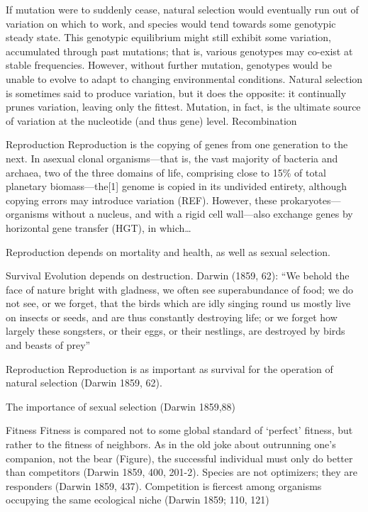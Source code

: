 \documentclass{tufte-book} %
\begin{document}
If mutation were to suddenly cease, natural selection would eventually run out of variation on which to work, and species would tend towards some genotypic steady state. This genotypic equilibrium might still exhibit some variation, accumulated through past mutations; that is, various genotypes may co-exist at stable frequencies. However, without further mutation, genotypes would be unable to evolve to adapt to changing environmental conditions. Natural selection is sometimes said to produce variation, but it does the opposite: it continually prunes variation, leaving only the fittest. Mutation, in fact, is the ultimate source of variation at the nucleotide (and thus gene) level.
Recombination

Reproduction
Reproduction is the copying of genes from one generation to the next. In asexual clonal organisms—that is, the vast majority of bacteria and archaea, two of the three domains of life, comprising close to 15\% of total planetary biomass—the[1] genome is copied in its undivided entirety, although copying errors may introduce variation (REF). However, these prokaryotes—organisms without a nucleus, and with a rigid cell wall—also exchange genes by horizontal gene transfer (HGT), in which…



Reproduction depends on mortality and health, as well as sexual selection.


Survival
Evolution depends on destruction. Darwin (1859, 62):
“We behold the face of nature bright with gladness, we often see superabundance of food; we do not see, or we forget, that the birds which are idly singing round us mostly live on insects or seeds, and are thus constantly destroying life; or we forget how largely these songsters, or their eggs, or their nestlings, are destroyed by birds and beasts of prey” 


Reproduction
Reproduction is as important as survival for the operation of natural selection (Darwin 1859, 62). 

The importance of sexual selection (Darwin 1859,88)

Fitness
Fitness is compared not to some global standard of ‘perfect’ fitness, but rather to the fitness of neighbors. As in the old joke about outrunning one’s companion, not the bear (Figure), the successful individual must only do better than competitors (Darwin 1859, 400, 201-2). Species are not optimizers; they are responders (Darwin 1859, 437). Competition is fiercest among organisms occupying the same ecological niche (Darwin 1859; 110, 121)
\end{document}

